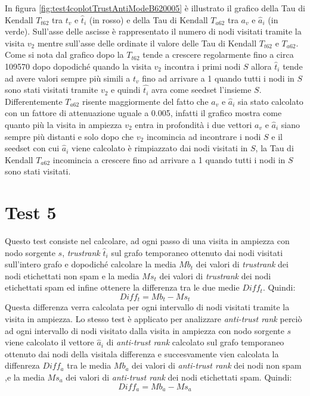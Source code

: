 In figura \ref{fig:test4coplotTrustAntiModeB620005} è illustrato il grafico della Tau di Kendall \(T_{t62}\) tra \(t_v\) e \(\hat{t}_i\) (in rosso)  e della Tau di Kendall \(T_{a62}\) tra \(a_v\) e \(\hat{a}_i\) (in verde). Sull'asse delle ascisse è rappresentato il numero di nodi visitati tramite la visita \(v_2\) mentre sull'asse delle ordinate il valore delle Tau di Kendall \(T_{t62}\) e \(T_{a62}\). Come si nota dal grafico dopo la \(T_{t62}\) tende a crescere regolarmente fino a circa 109570 dopo dopodiché quando la visita \(v_2\) incontra i primi nodi \(S\) allora \(\hat{t}_i\) tende ad avere valori sempre più simili a \(t_v\) fino ad arrivare a 1 quando tutti i nodi in \(S\) sono stati visitati tramite \(v_2\) e quindi \(\hat{t_i}\) avra come seedset l'insieme \(S\). Differentemente \(T_{a62}\) risente maggiormente del fatto che \(a_v\) e \(\hat{a}_i\) sia stato calcolato con un fattore di attenuazione uguale a 0.005, infatti il grafico mostra come quanto più la visita in ampiezza \(v_2\) entra in 
profondità i due vettori \(a_v\) e \(\hat{a}_i\) siano sempre più distanti e solo dopo che \(v_2\) incomincia ad incontrare i nodi \(S\) e il seedset con cui \(\hat{a}_i\) viene calcolato è rimpiazzato dai nodi visitati in \(S\), la Tau di Kendall \(T_{a62}\) incomincia a crescere fino ad arrivare a 1 quando tutti i nodi  in \(S\) sono stati visitati.


\section{Test 5}
Questo test consiste nel calcolare, ad ogni passo di una visita in ampiezza  con nodo sorgente \(s\), \textit{trustrank} \(\hat{t}_i\) sul grafo temporaneo ottenuto dai nodi visitati sull'intero grafo e dopodiché calcolare la media \(Mb_t\) dei valori di \textit{trustrank} dei nodi etichettati non spam e la media \(Ms_t\) dei valori di \textit{trustrank} dei nodi etichettati spam ed infine ottenere la differenza tra le due medie \(Diff_t\). Quindi:
\begin{equation}
 Diff_t = Mb_t-Ms_t
\end{equation}
Questa differenza verra calcolata per ogni intervallo di nodi visitati tramite la visita in ampiezza. Lo stesso test è applicato per analizzare \textit{anti-trust rank} perciò ad ogni intervallo di nodi visitato  dalla visita in ampiezza con nodo sorgente \(s\) viene calcolato il vettore \(\hat{a}_i\)  di \textit{anti-trust rank}  calcolato sul grafo temporaneo ottenuto dai nodi della visitala differenza e succesvamente vien calcolata la diffenreza \(Diff_a\) tra le media \(Mb_a\) dei valori di \textit{anti-trust rank} dei nodi non spam ,e la media \(Ms_a\) dei valori di \textit{anti-trust rank} dei nodi etichettati spam. Quindi:
\begin{equation}
 Diff_a=Mb_a-Ms_a
\end{equation}

